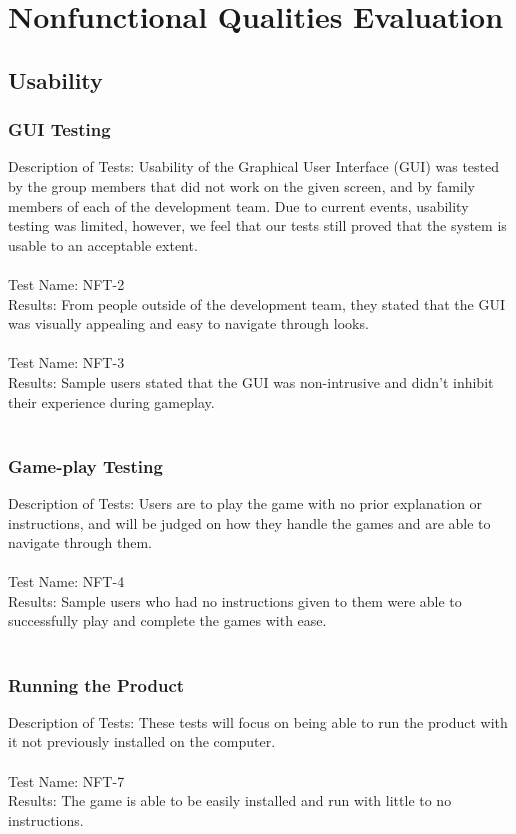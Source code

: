 \documentclass[12pt, titlepage]{article}
\begin{document}
\section{Nonfunctional Qualities Evaluation} 

	\subsection{Usability}
	
	\subsubsection{GUI Testing}
	Description of Tests: Usability of the Graphical User Interface (GUI) was tested by the group members that did not work on the given screen, and by family members of each of the development team. Due to current events, usability testing was limited, however, we feel that our tests still proved that the system is usable to an acceptable extent.\\ \\
	Test Name: NFT-2\\
	Results: From people outside of the development team, they stated that the GUI was visually appealing and easy to navigate through looks.\\ \\
	Test Name: NFT-3\\
	Results: Sample users stated that the GUI was non-intrusive and didn't inhibit their experience during gameplay. \\ \\
	
	\subsubsection{Game-play Testing}
	Description of Tests: Users are to play the game with no prior explanation or instructions, and will be judged on how they handle the games and are able to navigate through them. \\ \\
	Test Name: NFT-4 \\ 
	Results: Sample users who had no instructions given to them were able to successfully play and complete the games with ease. \\ \\
	
	\subsubsection{Running the Product}
	Description of Tests: These tests will focus on being able to run the product with it not previously installed on the computer.\\ \\
	Test Name: NFT-7 \\
	Results: The game is able to be easily installed and run with little to no instructions. \\ \\
\end{document}
